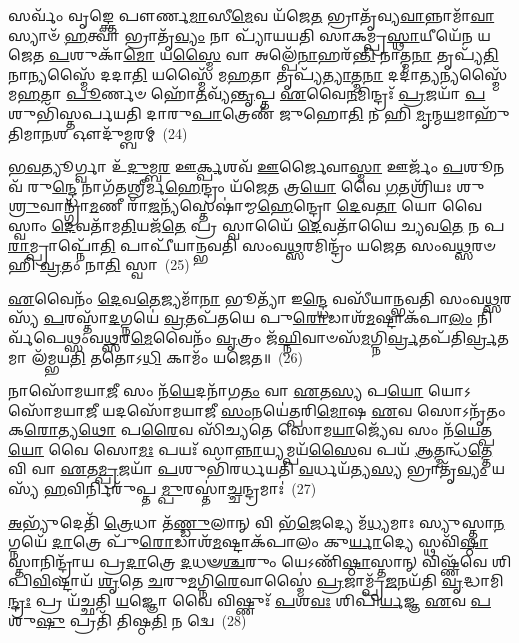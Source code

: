𑌸𑌰𑍍𑌵𑌂᳴ 𑌵𑍃𑌙𑍍𑌕𑍍𑌤𑍇 𑌪𑍗𑌰𑍍𑌣\-\ul{𑌮𑌾}\-𑌸𑍀\-\ul{𑌮𑍇}\-𑌵 𑌯᳴𑌜𑍇\-\ul{𑌤} 𑌭𑍍𑌰𑌾𑌤𑍃᳴𑌵𑍍𑌯\-\ul{𑌵𑌾}\-𑌨𑍍𑌨𑌾𑌮𑌾᳴\-\ul{𑌵𑌾}\-𑌸𑍍𑌯𑌾𑍞᳴ \ul{𑌹}\-𑌤𑍍𑌵𑌾 𑌭𑍍𑌰𑌾𑌤𑍃᳴\-\ul{𑌵𑍍𑌯𑌂} 𑌨𑌾 𑌪𑍍𑌯𑌾᳴𑌯𑌯𑌤𑌿 𑌸𑌾𑌕𑌮𑍍𑌪𑍍𑌰\-\ul{𑌸𑍍𑌥𑌾}\-𑌯𑍀𑌯𑍇᳴𑌨 𑌯𑌜𑍇𑌤 \ul{𑌪}\-𑌶𑍁𑌕𑌾᳴\-\ul{𑌮𑍋} 𑌯\-\ul{𑌸𑍍𑌮𑍈} 𑌵𑌾 𑌅𑌲𑍍𑌪𑍇᳴\-\ul{𑌨𑌾}\-𑌹𑌰᳴\-\ul{𑌨𑍍𑌤𑌿} 𑌨𑌾𑌤𑍍𑌮\-\ul{𑌨𑌾} 𑌤𑍃𑌪𑍍𑌯᳴\-\ul{𑌤𑌿} 𑌨𑌾𑌨𑍍𑌯𑌸𑍍𑌮𑍈᳴ 𑌦𑌦𑌾\-\ul{𑌤𑌿} 𑌯𑌸𑍍𑌮𑍈᳴ 𑌮\-\ul{𑌹}\-𑌤𑌾 𑌤𑍃𑌪𑍍𑌯᳴\-\ul{𑌤𑍍𑌯𑌾}\-𑌤𑍍𑌮\-\ul{𑌨𑌾} 𑌦𑌦𑌾॑\-\ul{𑌤𑍍𑌯}\-𑌨𑍍𑌯𑌸𑍍𑌮𑍈᳴ 𑌮\-\ul{𑌹}\-𑌤𑌾 \ul{𑌪𑍂}\-𑌰𑍍𑌣𑍞 𑌹𑍋᳴\-\ul{𑌤}\-𑌵𑍍𑌯᳴\-\ul{𑌨𑍍𑌤𑍃}\-𑌪𑍍𑌤 \ul{𑌏}\-𑌵𑍈\-\ul{𑌨}\-𑌮𑌿𑌨𑍍𑌦𑍍𑌰𑌃᳴ \ul{𑌪𑍍𑌰}\-𑌜𑌯𑌾᳴ \ul{𑌪}\-𑌶𑍁𑌭𑌿᳴𑌸𑍍𑌤𑌰𑍍𑌪𑌯𑌤𑌿 𑌦𑌾𑌰𑍁\-\ul{𑌪𑌾}\-𑌤𑍍𑌰𑍇𑌣᳴ 𑌜𑍁𑌹𑍋\-\ul{𑌤𑌿} 𑌨 𑌹𑌿 \ul{𑌮𑍃}\-𑌨𑍍𑌮\-\ul{𑌯}\-𑌮𑌾𑌹𑍁᳴𑌤𑌿𑌮𑌾\-\ul{𑌨}\-𑌶 𑌔𑌦𑍁᳴𑌮𑍍𑌬𑌰𑌮𑍍~(24)

\-\ul{𑌭}\-\-\ul{𑌵}\-𑌤𑍍𑌯𑍂𑌰𑍍𑌗𑍍𑌵𑌾 𑌉᳴\-\ul{𑌦𑍁}\-𑌮𑍍𑌬\-\ul{𑌰} 𑌊\-\ul{𑌰𑍍𑌕𑍍𑌪}\-𑌶𑌵᳴ \ul{𑌊}\-𑌰𑍍𑌜𑍈𑌵𑌾\-\ul{𑌸𑍍𑌮𑌾} 𑌊𑌰𑍍𑌜𑌂᳴ \ul{𑌪}\-𑌶𑍂𑌨𑌵᳴ 𑌰𑍁\-\ul{𑌨𑍍𑌦𑍍𑌧𑍇} 𑌨𑌾𑌗᳴𑌤𑌶𑍍𑌰𑍀𑌰𑍍𑌮\-\ul{𑌹𑍇}\-𑌨𑍍𑌦𑍍𑌰𑌂 𑌯᳴𑌜𑍇\-\ul{𑌤} 𑌤𑍍𑌰\-\ul{𑌯𑍋} 𑌵𑍈 \ul{𑌗}\-𑌤𑌶𑍍𑌰𑌿᳴𑌯𑌃 𑌶𑍁\-\ul{𑌶𑍍𑌰𑍁}\-𑌵𑌾𑌨𑍍𑌗𑍍𑌰𑌾᳴\-\ul{𑌮}\-𑌣𑍀 𑌰𑌾᳴\-\ul{𑌜}\-𑌨𑍍𑌯᳴𑌸𑍍𑌤𑍇𑌷𑌾॑𑌮𑍍𑌮\-\ul{𑌹𑍇}\-𑌨𑍍𑌦𑍍𑌰𑍋 \ul{𑌦𑍇}\-𑌵\-\ul{𑌤𑌾} 𑌯𑍋 𑌵𑍈 𑌸𑍍𑌵𑌾𑌂 \ul{𑌦𑍇}\-𑌵𑌤𑌾᳴𑌮\-\ul{𑌤𑌿}\-𑌯𑌜᳴\-\ul{𑌤𑍇} 𑌪𑍍𑌰 𑌸𑍍𑌵𑌾𑌯𑍈᳴ \ul{𑌦𑍇}\-𑌵𑌤𑌾᳴𑌯𑍈 𑌚𑍍𑌯𑌵\-\ul{𑌤𑍇} 𑌨 𑌪\-\ul{𑌰𑌾}\-𑌮𑍍𑌪𑍍𑌰𑌾𑌪𑍍𑌨𑍋᳴\-\ul{𑌤𑌿} 𑌪𑌾𑌪𑍀᳴𑌯𑌾𑌨𑍍𑌭𑌵𑌤𑌿 𑌸𑌂𑌵\-\ul{𑌥𑍍𑌸}\-𑌰𑌮𑌿𑌨𑍍𑌦𑍍𑌰𑌂᳴ 𑌯𑌜𑍇𑌤 𑌸𑌂𑌵\-\ul{𑌥𑍍𑌸}\-𑌰𑍞 𑌹𑌿 \ul{𑌵𑍍𑌰}\-𑌤𑌂 𑌨𑌾\-\ul{𑌤𑌿} 𑌸𑍍𑌵𑌾~(25)

\-\ul{𑌏}\-𑌵𑍈𑌨𑌂᳴ \ul{𑌦𑍇}\-𑌵\-\ul{𑌤𑍇}\-𑌜𑍍𑌯𑌮𑌾᳴\-\ul{𑌨𑌾} 𑌭𑍂𑌤𑍍𑌯𑌾᳴ 𑌇\-\ul{𑌨𑍍𑌦𑍍𑌧𑍇} 𑌵𑌸𑍀᳴𑌯𑌾𑌨𑍍𑌭𑌵𑌤𑌿 𑌸𑌂𑌵\-\ul{𑌥𑍍𑌸}\-𑌰𑌸𑍍𑌯᳴ \ul{𑌪}\-𑌰𑌸𑍍𑌤𑌾᳴\-\ul{𑌦}\-𑌗𑍍𑌨𑌯𑍇॑ \ul{𑌵𑍍𑌰}\-𑌤𑌪᳴𑌤𑌯𑍇 𑌪𑍁\-\ul{𑌰𑍋}\-𑌡𑌾𑌶᳴\-\-\ul{𑌮}\-𑌷𑍍𑌟𑌾\-𑌕᳴𑌪𑌾\-\ul{𑌲𑌂} 𑌨𑌿𑌰𑍍𑌵᳴𑌪𑍇𑌥𑍍𑌸𑌂𑌵\-\ul{𑌥𑍍𑌸}\-𑌰\-\ul{𑌮𑍇}\-𑌵𑍈𑌨𑌂᳴ \ul{𑌵𑍃}\-𑌤𑍍𑌰𑌂 𑌜᳴\-\ul{𑌘𑍍𑌨𑌿}\-𑌵𑌾𑍞𑌸᳴\-\ul{𑌮}\-𑌗𑍍𑌨𑌿\-\ul{𑌰𑍍𑌵𑍍𑌰}\-𑌤𑌪᳴𑌤𑌿\-\ul{𑌰𑍍𑌵𑍍𑌰}\-𑌤𑌮𑌾 𑌲᳴𑌮𑍍𑌭𑌯\-\ul{𑌤𑌿} 𑌤𑌤𑍋\-𑌽\-\ul{𑌧𑌿} 𑌕𑌾𑌮𑌂᳴ 𑌯𑌜𑍇𑌤॥~(26)

{\anuvakamend[{\-\ul{𑌏}\-𑌤𑌾𑌨𑍍𑌤𑌦𑍗𑌦𑍁᳴𑌮𑍍𑌬\-\ul{𑌰}\-\-\ul{𑍟} 𑌸𑍍𑌵𑌾 \ul{𑌤𑍍𑌰𑌿}\-\-\ul{𑍞}\-𑌶𑌚𑍍𑌚᳴}]}%

𑌨𑌾𑌸𑍋᳴𑌮𑌯𑌾\-\ul{𑌜𑍀} 𑌸𑌂 𑌨᳴\-\ul{𑌯𑍇}\-𑌦𑌨𑌾᳴𑌗\-\ul{𑌤𑌂} 𑌵𑌾 \ul{𑌏}\-𑌤\-\ul{𑌸𑍍𑌯} 𑌪\-\ul{𑌯𑍋} 𑌯𑍋\-𑌽𑌸𑍋᳴𑌮𑌯𑌾\-\ul{𑌜𑍀} 𑌯𑌦𑌸𑍋᳴𑌮𑌯𑌾𑌜𑍀 \ul{𑌸𑌂}\-𑌨𑌯𑍇॑𑌤𑍍𑌪𑌰𑌿\-\ul{𑌮𑍋}\-𑌷 \ul{𑌏}\-𑌵 𑌸𑍋\-𑌽𑌨𑍃᳴𑌤𑌂 𑌕\-\ul{𑌰𑍋}\-𑌤𑍍𑌯\-\ul{𑌥𑍋} 𑌪\-\ul{𑌰𑍈}\-𑌵 𑌸𑌿᳴𑌚𑍍𑌯𑌤𑍇 𑌸𑍋𑌮\-\ul{𑌯𑌾}\-𑌜𑍍𑌯𑍇᳴𑌵 𑌸𑌂 𑌨᳴\-\ul{𑌯𑍇}\-𑌤𑍍𑌪\-\ul{𑌯𑍋} 𑌵𑍈 𑌸𑍋\-\ul{𑌮𑌃} 𑌪𑌯𑌃᳴ 𑌸𑌾\-\ul{𑌨𑍍𑌨𑌾}\-𑌯𑍍𑌯𑌮𑍍𑌪𑌯᳴\-\ul{𑌸𑍈}\-𑌵 𑌪𑌯᳴ \ul{𑌆}\-𑌤𑍍𑌮𑌨𑍍𑌧᳴\-\ul{𑌤𑍍𑌤𑍇} 𑌵𑌿 𑌵𑌾 \ul{𑌏}\-𑌤\-\ul{𑌮𑍍𑌪𑍍𑌰}\-𑌜𑌯𑌾᳴ \ul{𑌪}\-𑌶𑍁𑌭𑌿᳴𑌰𑌰𑍍𑌧𑌯𑌤𑌿 \ul{𑌵}\-𑌰𑍍𑌧𑌯᳴𑌤𑍍𑌯\-\ul{𑌸𑍍𑌯} 𑌭𑍍𑌰𑌾𑌤𑍃᳴\-\ul{𑌵𑍍𑌯𑌂} 𑌯𑌸𑍍𑌯᳴ \ul{𑌹}\-𑌵𑌿𑌰𑍍𑌨𑌿𑌰𑍁᳴𑌪𑍍𑌤\-\ul{𑌮𑍍𑌪𑍁}\-𑌰𑌸𑍍𑌤𑌾॑\-\ul{𑌚𑍍𑌚}\-𑌨𑍍𑌦𑍍𑌰𑌮𑌾𑌃॑~(27)

\-\ul{𑌅}\-𑌭𑍍𑌯𑍁᳴𑌦𑍇𑌤𑌿᳴ \ul{𑌤𑍍𑌰𑍇}\-𑌧𑌾 𑌤᳴\-\ul{𑌣𑍍𑌡𑍁}\-𑌲𑌾𑌨𑍍 𑌵𑌿 𑌭᳴\-\ul{𑌜𑍇}\-𑌦𑍍𑌯𑍇 𑌮᳴\-\ul{𑌧𑍍𑌯}\-𑌮𑌾𑌃 𑌸𑍍𑌯𑍁𑌸𑍍𑌤𑌾\-\ul{𑌨}\-𑌗𑍍𑌨𑌯𑍇᳴ \ul{𑌦𑌾}\-𑌤𑍍𑌰𑍇 𑌪𑍁᳴\-\ul{𑌰𑍋}\-𑌡𑌾𑌶᳴\-\ul{𑌮}\-𑌷𑍍𑌟𑌾𑌕᳴𑌪𑌾𑌲𑌂 𑌕𑍁\-\ul{𑌰𑍍𑌯𑌾}\-𑌦𑍍𑌯𑍇 𑌸𑍍𑌥𑌵𑌿᳴\-\ul{𑌷𑍍𑌠𑌾}\-𑌸𑍍𑌤𑌾𑌨𑌿𑌨𑍍𑌦𑍍𑌰𑌾᳴𑌯 𑌪𑍍𑌰\-\ul{𑌦𑌾}\-𑌤𑍍𑌰𑍇 \ul{𑌦}\-𑌧𑍟\-\ul{𑌶𑍍𑌚}\-𑌰𑍁𑌂 𑌯𑍇\-𑌽𑌣𑌿᳴\-\ul{𑌷𑍍𑌠𑌾}\-𑌸𑍍𑌤𑌾𑌨𑍍 𑌵𑌿𑌷𑍍𑌣᳴𑌵𑍇 𑌶𑌿𑌪𑌿\-\ul{𑌵𑌿}\-𑌷𑍍𑌟𑌾𑌯᳴ \ul{𑌶𑍃}\-𑌤𑍇 \ul{𑌚}\-𑌰𑍁\-\ul{𑌮}\-𑌗𑍍𑌨𑌿\-\ul{𑌰𑍇}\-𑌵𑌾𑌸𑍍𑌮𑍈॑ \ul{𑌪𑍍𑌰}\-𑌜𑌾𑌮𑍍𑌪𑍍𑌰᳴\-\ul{𑌜}\-𑌨𑌯᳴𑌤𑌿 \ul{𑌵𑍃}\-𑌦𑍍𑌧𑌾𑌮𑌿\-\ul{𑌨𑍍𑌦𑍍𑌰𑌃} 𑌪𑍍𑌰 𑌯᳴𑌚𑍍𑌛𑌤𑌿 \ul{𑌯}\-𑌜𑍍𑌞𑍋 𑌵𑍈 𑌵𑌿𑌷𑍍𑌣𑍁𑌃᳴ \ul{𑌪}\-𑌶\-\ul{𑌵𑌃} 𑌶𑌿𑌪𑌿᳴\-\ul{𑌰𑍍𑌯}\-𑌜𑍍𑌞 \ul{𑌏}\-𑌵 \ul{𑌪}\-𑌶𑍁\-\ul{𑌷𑍁} 𑌪𑍍𑌰𑌤𑌿᳴ 𑌤𑌿𑌷𑍍𑌠\-\ul{𑌤𑌿} 𑌨 𑌦𑍍𑌵𑍇~(28)

